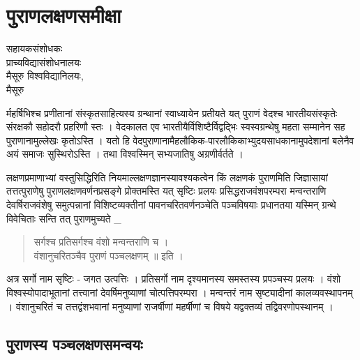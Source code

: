 \chapter{पुराणलक्षणसमीक्षा}

\begin{center}
\smallskip

सहायकसंशोधकः\\
प्राच्यविद्यासंशोधनालयः\\
मैसूरु विश्वविद्यानिलयः,\\ 
मैसूरु
\end{center}

र्महर्षिभिश्च प्रणीतानां संस्कृतसाहित्यस्य ग्रन्थानां स्वाध्यायेन प्रतीयते यत् पुराणं वेदश्च भारतीयसंस्कृतेः संरक्षकौ सहोदरौ प्रहरिणौ स्तः । वेदकालत एव भारतीयैर्विशिष्टैर्विद्वद्भिः स्वस्वग्रन्थेषु महता सम्मानेन सह पुराणानामुल्लेखः कृतोऽस्ति । यतो हि वेदपुराणानामैहलौकिक-पारलौकिकाभ्युदयसाधकानामुपदेशानां बलेनैव अयं समाजः सुस्थिरोऽस्ति । तथा विश्वस्मिन् सभ्यजातिषु अग्रणीर्वर्तते ।

लक्षणप्रमाणाभ्यां वस्तुसिद्धिरिति नियमाल्लक्षणज्ञानस्यावश्यकत्वेन किं लक्षणकं पुराणमिति जिज्ञासायां तत्तत्पुराणेषु पुराणलक्षणवर्णनप्रसङ्गे प्रोक्तमस्ति यत् सृष्टिः प्रलयः प्रसिद्धराजवंशपरम्परा मन्वन्तराणि देवर्षिराजवंशेषु समुत्पन्नानां विशिष्टव्यक्तीनां पावनचरितवर्णनञ्चेति पञ्चविषयाः प्रधानतया यस्मिन् ग्रन्थे विवेचिताः सन्ति तत् पुराणमुच्यते _
\begin{verse}
सर्गश्च प्रतिसर्गश्च वंशो मन्वन्तराणि च ।\\
वंशानुचरितञ्चैव पुराणं पञ्चलक्षणम् ॥ इति ।
\end{verse}
अत्र सर्गो नाम सृष्टिः - जगत उत्पत्तिः । प्रतिसर्गो नाम दृश्यमानस्य समस्तस्य प्रपञ्चस्य प्रलयः । वंशो विश्वस्योपादाभूतानां तत्त्वानां देवर्षिमनुष्याणां चोत्पत्तिपरम्परा । मन्वन्तरं नाम सृष्ट्यादीनां कालव्यवस्थापनम् । वंशानुचरितं च तत्तद्वंशभवानां मनुष्याणां राजर्षीणां महर्षीणां च विषये यद्वक्तव्यं तद्विवरणोपस्थानम् ।

\section*{पुराणस्य पञ्चलक्षणसमन्वयः}

